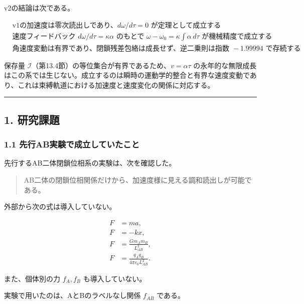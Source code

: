 \documentclass[
  a4paper,
]{ltjsarticle}
\begin{document}
v2の結論は次である。

\[
\boxed{
\begin{aligned}
&\text{v1の加速度は零次読出しであり、}d\omega/d\tau=0\text{ が定理として成立する}\\
&\text{速度フィードバック }d\omega/d\tau=\kappa\alpha\text{ のもとで }\omega-\omega_0=\kappa\int\alpha\,d\tau\text{ が機械精度で成立する}\\
&\text{角速度変動は有界であり、閉鎖残差包絡は成長せず、逆二乗則は指数 }-1.99994\text{ で存続する}
\end{aligned}
}
\]

保存量
\(\mathcal I\)（第13.4節）の等位集合が有界であるため、\(v=\alpha\tau\)
の永年的な無限成長はこの系では生じない。成立するのは瞬時の運動学的整合と有界な速度変動であり、これは束縛軌道における加速度と速度変化の関係に対応する。

\begin{center}\rule{0.5\linewidth}{0.5pt}\end{center}

\subsection{1. 研究課題}\label{ux7814ux7a76ux8ab2ux984c}

\subsubsection{1.1
先行AB実験で成立していたこと}\label{ux5148ux884cabux5b9fux9a13ux3067ux6210ux7acbux3057ux3066ux3044ux305fux3053ux3068}

先行するAB二体閉鎖位相系の実験は、次を確認した。

\begin{quote}
AB二体の閉鎖位相関係だけから、加速度様に見える調和読出しが可能である。
\end{quote}

外部から次の式は導入していない。

\[
\begin{aligned}
F&=ma,\\
F&=-kx,\\
F&=\frac{Gm_A m_B}{L_{AB}^2},\\
F&=\frac{q_Aq_B}{4\pi\varepsilon_0L_{AB}^2}.
\end{aligned}
\]

また、個体別の力 \(f_A,f_B\) も導入していない。

実験で用いたのは、AとBのラベルなし関係 \(f_{AB}\) である。
\end{document}
